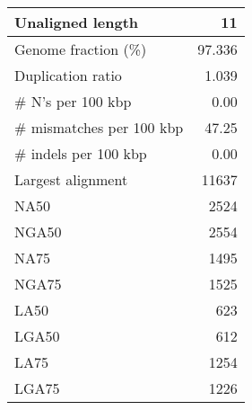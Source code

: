 \documentclass[12pt,a4paper]{article}
\begin{document}
\begin{table}[ht]
\begin{center}
\begin{tabular}{|l*{1}{|r}|}
Unaligned length & 11 \\ \hline
Genome fraction (\%) & 97.336 \\ \hline
Duplication ratio & 1.039 \\ \hline
\# N's per 100 kbp & 0.00 \\ \hline
\# mismatches per 100 kbp & 47.25 \\ \hline
\# indels per 100 kbp & 0.00 \\ \hline
Largest alignment & 11637 \\ \hline
NA50 & 2524 \\ \hline
NGA50 & 2554 \\ \hline
NA75 & 1495 \\ \hline
NGA75 & 1525 \\ \hline
LA50 & 623 \\ \hline
LGA50 & 612 \\ \hline
LA75 & 1254 \\ \hline
LGA75 & 1226 \\ \hline
\end{tabular}
\end{center}
\end{table}
\end{document}
